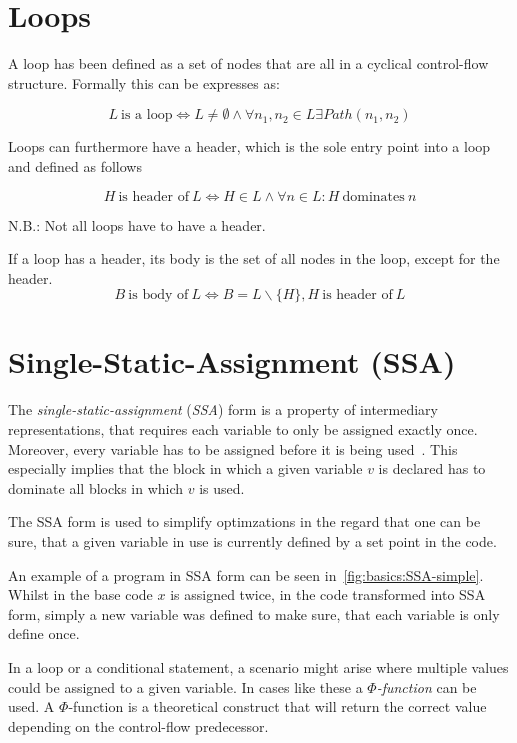 
\section{Loops}\label{sec:basics:loops}

A loop has been defined as a set of nodes that are all in a cyclical control-flow structure.
Formally this can be expresses as:

$$L~\text{is a loop} \Longleftrightarrow L \neq \emptyset \wedge \forall n_1, n_2 \in L \exists Path(n_1, n_2)$$

Loops can furthermore have a header, which is the sole entry point into a loop~\cite{aebi18bachelorarbeit} and defined as follows

$$H~\text{is header of}~L \Longleftrightarrow H \in L \wedge \forall n \in L: H~\text{dominates}~n$$

N.B.: Not all loops have to have a header.

If a loop has a header, its body is the set of all nodes in the loop, except for the header.
$$B~\text{is body of}~L \Longleftrightarrow B = L \backslash \{H\}, H~\text{is header of}~L$$

\section{Single-Static-Assignment (SSA)}\label{sec:basics:ssa}

The \textit{single-static-assignment} (\textit{SSA}) form is a property of intermediary representations, that requires each variable to only be assigned exactly once.
Moreover, every variable has to be assigned before it is being used~\cite{cytron91}.
This especially implies that the block in which a given variable $v$ is declared has to dominate all blocks in which $v$ is used.

The SSA form is used to simplify optimzations in the regard that one can be sure, that a given variable in use is currently defined by a set point in the code.

An example of a program in SSA form can be seen in~\cref{fig:basics:SSA-simple}.
Whilst in the base code $x$ is assigned twice, in the code transformed into SSA form, simply a new variable was defined to make sure, that each variable is only define once.



In a loop or a conditional statement, a scenario might arise where multiple values could be assigned to a given variable.
In cases like these a \textit{$\Phi$-function} can be used.
A $\Phi$-function is a theoretical construct that will return the correct value depending on the control-flow predecessor.

